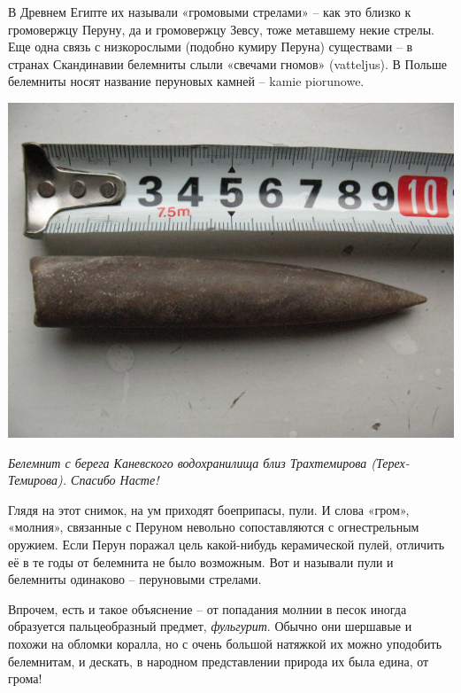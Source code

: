 В Древнем Египте их называли «громовыми стрелами» – как это близко к громовержцу Перуну, да и громовержцу Зевсу, тоже метавшему некие стрелы. Еще одна связь с низкорослыми (подобно кумиру Перуна) существами – в странах Скандинавии белемниты слыли «свечами гномов» (vatteljus). В Польше белемниты носят название перуновых камней – kamie piorunowe.

\begin{center}
\includegraphics[width=\linewidth]{chast-zmiy/ktotakiezmei/s-IMG_4455.JPG}

\textit{Белемнит с берега Каневского водохранилища близ Трахтемирова (Терех-Темирова). Спасибо Насте!}
\end{center}

Глядя на этот снимок, на ум приходят боеприпасы, пули. И слова «гром», «молния», связанные с Перуном невольно сопоставляются с огнестрельным оружием. Если Перун поражал цель какой-нибудь керамической пулей, отличить её в те годы от белемнита не было возможным. Вот и называли пули и белемниты одинаково – перуновыми стрелами.

Впрочем, есть и такое объяснение – от попадания молнии в песок иногда образуется пальцеобразный предмет, \textit{фульгурит}. Обычно они шершавые и похожи на обломки коралла, но с очень большой натяжкой их можно уподобить белемнитам, и дескать, в народном представлении природа их была едина, от грома!


